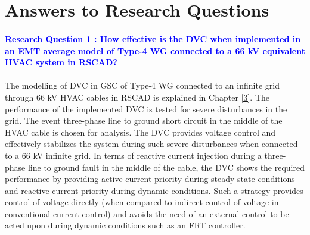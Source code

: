 



\section{Answers to Research Questions}
\vspace{2mm}
\paragraph{\textcolor{blue}{Research Question 1 : How effective is the \gls{DVC} when implemented in an \gls{EMT} average model of Type-4 \gls{WG} connected to a 66 kV equivalent \gls{HVAC} system in RSCAD?}}

\paragraph{} The modelling of \gls{DVC} in \gls{GSC} of Type-4 \gls{WG} connected to an infinite grid through 66 kV \gls{HVAC} cables in RSCAD is explained in Chapter \ref{3}. The performance of the implemented \gls{DVC} is tested for severe disturbances in the grid. The event three-phase line to ground short circuit in the middle of the \gls{HVAC} cable is chosen for analysis. The \gls{DVC} provides voltage control and effectively stabilizes the system during such severe disturbances when connected to a 66 kV infinite grid. In terms of reactive current injection during a three-phase line to ground fault in the middle of the cable, the \gls{DVC} shows the required performance by providing active current priority during steady state conditions and reactive current priority during dynamic conditions. Such a strategy provides control of voltage directly (when compared to indirect control of voltage in conventional current control) and avoids the need of an external control to be acted upon during dynamic conditions such as an FRT controller. 

